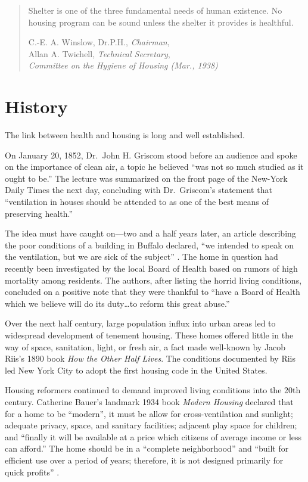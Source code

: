 \documentclass[
]{book}
\begin{document}
\begin{quote}
Shelter is one of the three fundamental needs of human existence. No housing program can be sound unless the shelter it provides is healthful.

C.-E. A. Winslow, Dr.P.H., \emph{Chairman},\\
Allan A. Twichell, \emph{Technical Secretary},\\
\emph{Committee on the Hygiene of Housing (Mar., 1938)}
\end{quote}

\hypertarget{history}{%
\section{History}\label{history}}

The link between health and housing is long and well established.

On January 20, 1852, Dr.~John H. Griscom stood before an audience and spoke on the importance of clean air, a topic he believed ``was not so much studied as it ought to be.'' The lecture was summarized on the front page of the New-York Daily Times the next day, concluding with Dr.~Griscom's statement that ``ventilation in houses should be attended to as one of the best means of preserving health.'' \citep{lectures1852}

The idea must have caught on---two and a half years later, an article describing the poor conditions of a building in Buffalo declared, ``we intended to speak on the ventilation, but we are sick of the subject'' \citep{thebuff1854}. The home in question had recently been investigated by the local Board of Health based on rumors of high mortality among residents. The authors, after listing the horrid living conditions, concluded on a positive note that they were thankful to ``have a Board of Health which we believe will do its duty\ldots to reform this great abuse.''

Over the next half century, large population influx into urban areas led to widespread development of tenement housing. \citep[ 7]{soifer2014} These homes offered little in the way of space, sanitation, light, or fresh air, a fact made well-known by Jacob Riis's 1890 book \emph{How the Other Half Lives}. The conditions documented by Riis led New York City to adopt the first housing code in the United States.

Housing reformers continued to demand improved living conditions into the 20th century. Catherine Bauer's landmark 1934 book \emph{Modern Housing} declared that for a home to be ``modern'', it must be allow for cross-ventilation and sunlight; adequate privacy, space, and sanitary facilities; adjacent play space for children; and ``finally it will be available at a price which citizens of average income or less can afford.'' The home should be in a ``complete neighborhood'' and ``built for efficient use over a period of years; therefore, it is not designed primarily for quick profits'' \citep{wurster2020}.
\end{document}
